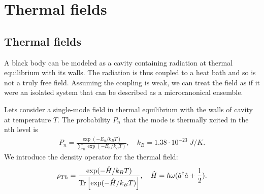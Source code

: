 \section{Thermal fields}

\subsection{Thermal fields}
A black body can be modeled as a cavity containing radiation at thermal equilibrium with its walls. 
The radiation is thus coupled to a heat bath and so is not a truly free field.
Assuming the coupling is weak, we can treat the field as if it were an isolated system that can be described as a microcanonical ensemble.

Lets consider a single-mode field in thermal equilibrium with the walls of cavity at temperature $T$. The probability $P_n$ that the mode is 
thermally xcited in the nth level is 
\begin{align*}
    P_n=\frac{\exp(-E_n/k_BT)}{\sum_n\exp(-E_n/k_BT)},\quad k_B=1.38\cdot10^{-23}\;J/K.
\end{align*}
We introduce the density operator for the thermal field:
\begin{align*}
    \rho_{Th}=\frac{\exp(-\hat{H}/k_BT)}{\text{Tr}\left[\exp(-\hat{H}/k_BT)\right]},\quad\hat{H}=\hbar\omega(\hat{a}^\dagger\hat{a}+\frac{1}{2}).
\end{align*}


